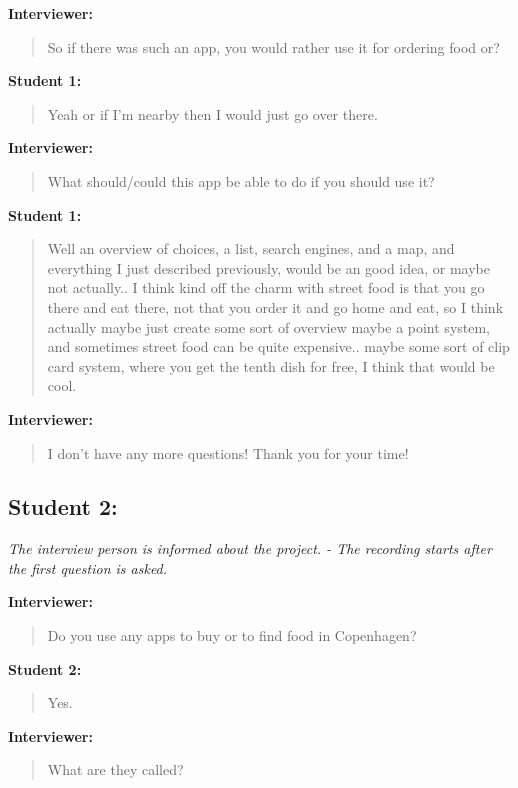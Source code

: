 \textbf{Interviewer:}
\begin{quotation}
    So if there was such an app, you would rather use it for ordering food or?
\end{quotation}

\textbf{Student 1:}
\begin{quotation}
     Yeah or if I’m nearby then I would just go over there.
\end{quotation}

\textbf{Interviewer:}
\begin{quotation}
    What should/could this app be able to do if you should use it?
\end{quotation}

\textbf{Student 1:}
\begin{quotation}
    Well an overview of choices, a list, search engines, and a map, and everything I just described previously, would be an good idea, or maybe not actually.. I think kind off the charm with street food is that you go there and eat there, not that you order it and go home and eat, so I think actually maybe just create some sort of overview maybe a point system, and sometimes street food can be quite expensive.. maybe some sort of clip card system, where you get the tenth dish for free, I think that would be cool.
\end{quotation}

\textbf{Interviewer:}
\begin{quotation}
    I don’t have any more questions! Thank you for your time!
\end{quotation}


\subsection{Student 2:}

\textit{The interview person is informed about the project. - The recording starts after the first question is asked.}

\textbf{Interviewer:}
\begin{quotation}
    Do you use any apps to buy or to find food in Copenhagen?
\end{quotation}

\textbf{Student 2:}
\begin{quotation}
    Yes.
\end{quotation}

\textbf{Interviewer:}
\begin{quotation}
    What are they called?
\end{quotation}

